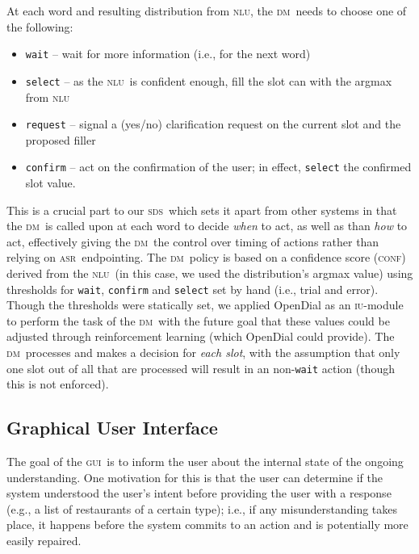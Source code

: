 \documentclass[11pt]{article}
\newcommand{\sds}[0]{\textsc{sds}}
\newcommand{\nlu}[0]{\textsc{nlu}}
\newcommand{\asr}[0]{\textsc{asr}}
\newcommand{\dm}[0]{\textsc{dm}}
\newcommand{\ui}[0]{\textsc{gui}}
\newcommand{\iu}[0]{\textsc{iu}}
\newcommand{\conf}[0]{\textsc{conf}}
\begin{document}
At each word and resulting distribution from \nlu, the \dm\ needs to choose one of the following:
\begin{itemize}
 \item \texttt{wait} -- wait for more information (i.e., for the next word) %
 \item \texttt{select} -- as the \nlu\ is confident enough, fill the slot can with the argmax from \nlu %
 \item \texttt{request} -- signal a (yes/no) clarification request on the current slot and the proposed filler%
 \item \texttt{confirm} -- act on the confirmation of the user; in effect, \texttt{select} the confirmed slot value.%
\end{itemize}

This is a crucial part to our \sds\ which sets it apart from other systems in that the \dm\ is called upon at each word to decide \emph{when} to act, as well as than \emph{how} to act, effectively giving the \dm\ the control over timing of actions rather than relying on \asr\ endpointing. The \dm\ policy is based on a confidence score (\conf) derived from the \nlu\ (in this case, we used the distribution's argmax value) using thresholds for \texttt{wait}, \texttt{confirm} and \texttt{select} set by hand (i.e., trial and error). Though the thresholds were statically set, we applied OpenDial \cite{Lison2015a} as an \iu-module to perform the task of the \dm\ with the future goal that these values could be adjusted through reinforcement learning (which OpenDial could provide). The \dm\ processes and makes a decision for \emph{each slot}, with the assumption that only one slot out of all that are processed will result in an non-\texttt{wait} action (though this is not enforced). 

\subsection{Graphical User Interface}
\label{section:display}

The goal of the \ui\ is to inform the user about the internal state of the ongoing understanding. One motivation for this is that the user can determine if the system understood the user's intent before providing the user with a response (e.g., a list of restaurants of a certain type); i.e., if any misunderstanding takes place, it happens before the system commits to an action and is potentially more easily repaired. 
\end{document}
